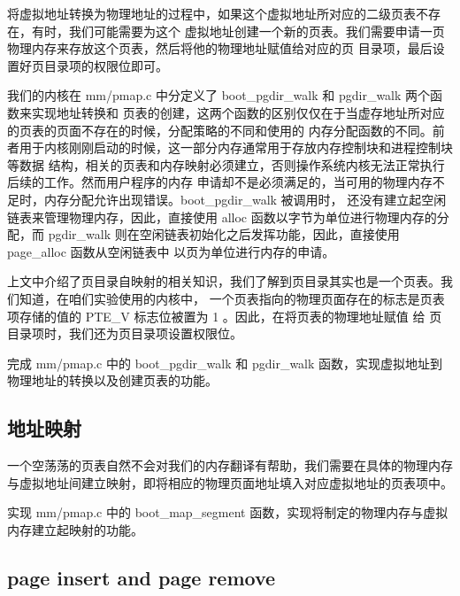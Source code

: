 将虚拟地址转换为物理地址的过程中，如果这个虚拟地址所对应的二级页表不存在，有时，我们可能需要为这个
虚拟地址创建一个新的页表。我们需要申请一页物理内存来存放这个页表，然后将他的物理地址赋值给对应的页
目录项，最后设置好页目录项的权限位即可。

我们的内核在 mm/pmap.c 中分定义了 boot\_pgdir\_walk 和 pgdir\_walk 两个函数来实现地址转换和
页表的创建，这两个函数的区别仅仅在于当虚存地址所对应的页表的页面不存在的时候，分配策略的不同和使用的
内存分配函数的不同。前者用于内核刚刚启动的时候，这一部分内存通常用于存放内存控制块和进程控制块等数据
结构，相关的页表和内存映射必须建立，否则操作系统内核无法正常执行后续的工作。然而用户程序的内存
申请却不是必须满足的，当可用的物理内存不足时，内存分配允许出现错误。boot\_pgdir\_walk 被调用时，
还没有建立起空闲链表来管理物理内存，因此，直接使用 alloc 函数以字节为单位进行物理内存的分配，而
 pgdir\_walk 则在空闲链表初始化之后发挥功能，因此，直接使用 page\_alloc 函数从空闲链表中
以页为单位进行内存的申请。

上文中介绍了页目录自映射的相关知识，我们了解到页目录其实也是一个页表。我们知道，在咱们实验使用的内核中，
一个页表指向的物理页面存在的标志是页表项存储的值的 PTE\_V 标志位被置为 1 。因此，在将页表的物理地址赋值
给 页目录项时，我们还为页目录项设置权限位。

\begin{exercise}
完成 mm/pmap.c 中的 boot\_pgdir\_walk 和 pgdir\_walk 函数，实现虚拟地址到物理地址的转换以及创建页表的功能。
\end{exercise}

\subsection{地址映射}
一个空荡荡的页表自然不会对我们的内存翻译有帮助，我们需要在具体的物理内存与虚拟地址间建立映射，即将相应的物理页面地址填入对应虚拟地址的页表项中。
\begin{exercise}
实现 mm/pmap.c 中的 boot\_map\_segment 函数，实现将制定的物理内存与虚拟内存建立起映射的功能。
\end{exercise}

\subsection{page insert and page remove}

